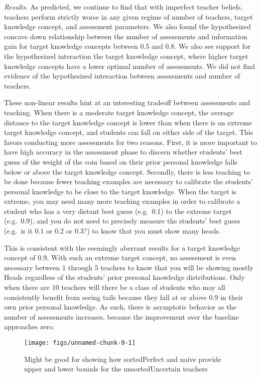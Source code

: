 \documentclass[10pt, letterpaper]{apa6}
\newenvironment{CodeChunk}{}{}
\begin{document}
\emph{Results. } As predicted, we continue to find that with imperfect
teacher beliefs, teachers perform strictly worse in any given regime of
number of teachers, target knowledge concept, and assessment parameters.
We also found the hypothesized concave down relationship between the
number of assessments and information gain for target knowledge concepts
between 0.5 and 0.8. We also see support for the hypothesized
interaction the target knowledge concept, where higher target knowledge
concepts have a lower optimal number of assessments. We did not find
evidence of the hypothesized interaction between assessments and number
of teachers.

These non-linear results hint at an interesting tradeoff between
assessments and teaching. When there is a moderate target knowledge
concept, the average distance to the target knowledge concept is lower
than when there is an extreme target knowledge concept, and students can
fall on either side of the target. This favors conducting more
assessments for two reasons. First, it is more important to have high
accuracy in the assessment phase to discern whether students' best guess
of the weight of the coin based on their prior personal knowledge falls
below or above the target knowledge concept. Secondly, there is less
teaching to be done because fewer teaching examples are necessary to
calibrate the students' personal knowledge to be close to the target
knowledge. When the target is extreme, you may need many more teaching
examples in order to calibrate a student who has a very distant best
guess (e.g.~0.1) to the extreme target (e.g.~0.9), and you do not need
to precisely measure the students' best guess (e.g.~is it 0.1 or 0.2 or
0.3?) to know that you must show many heads.

This is consistent with the seemingly aberrant results for a target
knowledge concept of 0.9. With such an extreme target concept, no
assessment is even necessary between 1 through 5 teachers to know that
you will be showing mostly Heads regardless of the students' prior
personal knowledge distributions. Only when there are 10 teachers will
there be a class of students who may all consistently benefit from
seeing tails because they fall at or above 0.9 in their own prior
personal knowledge. As such, there is asymptotic behavior as the number
of assessments increases, because the improvement over the baseline
approaches zero.

\begin{CodeChunk}
\begin{figure}[t]
\texttt{[image: figs/unnamed-chunk-9-1]} \caption[Might be good for showing how sortedPerfect and naive provide upper and lower bounds for the unsortedUncertain teachers]{Might be good for showing how sortedPerfect and naive provide upper and lower bounds for the unsortedUncertain teachers}\label{fig:unnamed-chunk-9}
\end{figure}
\end{CodeChunk}
\end{document}
